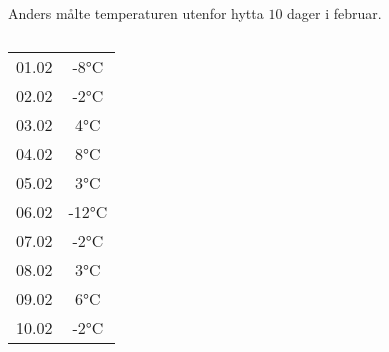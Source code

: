 %



\Oppgave[3] 

Anders målte temperaturen utenfor hytta $10$ dager i februar.

\begin{table}[H]
    \centering
    \begin{tabular}{|c |S[table-format=1.0]|}
         01.02 &  -8\si{\celsius} \\
         02.02 &  -2\si{\celsius} \\
         03.02 &   4\si{\celsius} \\
         04.02 &   8\si{\celsius} \\
         05.02 &   3\si{\celsius} \\
         06.02 & -12\si{\celsius} \\
         07.02 &  -2\si{\celsius} \\
         08.02 &   3\si{\celsius} \\
         09.02 &   6\si{\celsius} \\
         10.02 &  -2\si{\celsius} \\ \hline
    \end{tabular}
    \caption{}
    \label{tab:del-2-oppgave-2}
\end{table}

